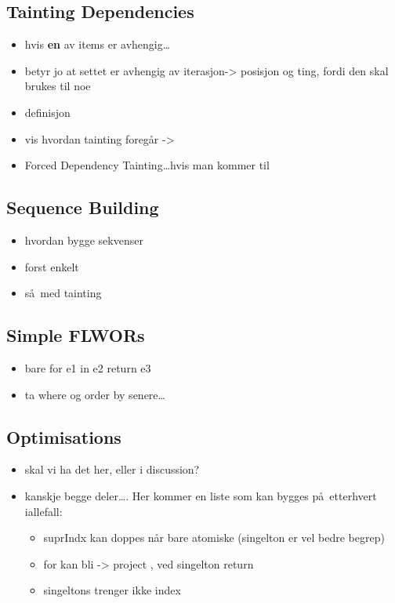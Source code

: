\subsection{Tainting Dependencies}
\label{sect:trans:TD:tainting}
\begin{itemize}
  \item hvis \textbf{en} av items er avhengig\ldots
  \item betyr jo at settet er avhengig av iterasjon-> posisjon og ting, fordi den skal brukes til noe
  \item definisjon
  \item vis hvordan tainting foreg\aa r ->
  \item Forced Dependency Tainting\ldots hvis man kommer til 
\end{itemize}

\subsection{Sequence Building}
\label{sect:trans:TD:seqBuild}
\begin{itemize}
  \item hvordan bygge sekvenser
  \item forst enkelt
  \item s\aa~med tainting
\end{itemize}

\subsection{Simple FLWORs}
\label{sect:trans:TD:simpleFLWOR}
\begin{itemize}
  \item bare for e1 in e2 return e3
  \item ta where og order by senere\ldots
\end{itemize}

\subsection{Optimisations}
\label{sect:trans:optimisations}
\begin{itemize}
  \item skal vi ha det her, eller i discussion?
  \item kanskje begge deler\ldots. Her kommer en liste som kan bygges p\aa~etterhvert iallefall:
	  \begin{itemize}
	    \item suprIndx kan doppes n\aa r bare atomiske (singelton er vel bedre begrep)
	    \item for kan bli -> project , ved singelton return
	    \item singeltons trenger ikke index
	  \end{itemize} 
\end{itemize}